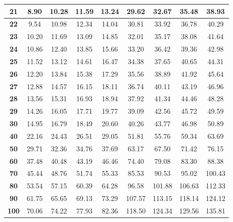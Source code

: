 \begin{tabular}{*{9}{|c}|}
\hline 
\textbf{21} & 8.90 &10.28 &11.59 &13.24 &29.62 &32.67 &35.48 &38.93 \\
\hline 
\textbf{22} & 9.54 &10.98 &12.34 &14.04 &30.81 &33.92 &36.78 &40.29 \\
\hline 
\textbf{23} & 10.20 &11.69 &13.09 &14.85 &32.01 &35.17 &38.08 &41.64 \\
\hline 
\textbf{24} & 10.86 &12.40 &13.85 &15.66 &33.20 &36.42 &39.36 &42.98 \\
\hline 
\textbf{25} & 11.52 &13.12 &14.61 &16.47 &34.38 &37.65 &40.65 &44.31 \\
\hline 
\textbf{26} & 12.20 &13.84 &15.38 &17.29 &35.56 &38.89 &41.92 &45.64 \\
\hline 
\textbf{27} & 12.88 &14.57 &16.15 &18.11 &36.74 &40.11 &43.19 &46.96 \\
\hline 
\textbf{28} & 13.56 &15.31 &16.93 &18.94 &37.92 &41.34 &44.46 &48.28 \\
\hline 
\textbf{29} & 14.26 &16.05 &17.71 &19.77 &39.09 &42.56 &45.72 &49.59 \\
\hline 
\textbf{30} & 14.95 &16.79 &18.49 &20.60 &40.26 &43.77 &46.98 &50.89 \\
\hline 
\textbf{40} & 22.16 &24.43 &26.51 &29.05 &51.81 &55.76 &59.34 &63.69 \\
\hline 
\textbf{50} & 29.71 &32.36 &34.76 &37.69 &63.17 &67.50 &71.42 &76.15 \\
\hline 
\textbf{60} & 37.48 &40.48 &43.19 &46.46 &74.40 &79.08 &83.30 &88.38 \\
\hline 
\textbf{70} & 45.44 &48.76 &51.74 &55.33 &85.53 &90.53 &95.02 &100.43 \\
\hline 
\textbf{80} & 53.54 &57.15 &60.39 &64.28 &96.58 &101.88 &106.63 &112.33 \\
\hline 
\textbf{90} & 61.75 &65.65 &69.13 &73.29 &107.57 &113.15 &118.14 &124.12 \\
\hline 
\textbf{100} & 70.06 &74.22 &77.93 &82.36 &118.50 &124.34 &129.56 &135.81 \\
\hline 
\end{tabular}